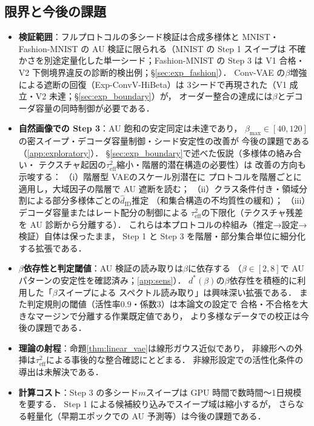\documentclass[11pt,a4paper]{jsarticle}
\newcommand{\hatdID}{\hat{d}_{\mathrm{ID}}}
\newcommand{\dstar}{d^{*}(\beta)}
\begin{document}
\subsection{限界と今後の課題}\label{sec:disc_limitation}

\begin{itemize}
  \item \textbf{検証範囲}：フルプロトコルの多シード検証は合成多様体と
        MNIST・Fashion-MNIST の AU 検証に限られる（MNIST の Step 1 スイープは
        不確かさを別途定量化した単一シード；Fashion-MNIST の Step 3 は
        V1 合格・V2 下側境界違反の診断的検出例；§\ref{sec:exp_fashion}）．
        Conv-VAE の$\beta$増強による遮断の回復（Exp-ConvV-HiBeta）は
        3シードで再現された（V1 成立・V2 未達；§\ref{sec:exp_boundary}）が，
        オーダー整合の達成には$\beta$とデコーダ容量の同時制御が必要である．
  \item \textbf{自然画像での Step 3}：AU 飽和の安定同定は未達であり，
        $\beta_{\max} \in [40, 120]$の密スイープ・デコーダ容量制御・シード安定性の改善が
        今後の課題である（\ref{app:exploratory}）．
        §\ref{sec:exp_boundary}で述べた仮説（多様体の絡み合い・
        テクスチャ起因の$\tau^2_{\mathrm{eff}}$縮小・階層的潜在構造の必要性）は
        改善の方向も示唆する：
        （i）階層型 VAE\cite{sonderby2016ladder}のスケール別潜在に
        プロトコルを階層ごとに適用し，大域因子の階層で AU 遮断を読む；
        （ii）クラス条件付き・領域分割による部分多様体ごとの$\hatdID$推定
        （和集合構造の不均質性の緩和）；
        （iii）デコーダ容量またはレート配分の制御による
        $\tau^2_{\mathrm{eff}}$の下限化（テクスチャ残差を AU 診断から分離する）．
        これらは本プロトコルの枠組み（推定→設定→検証）自体は保ったまま，
        Step 1 と Step 3 を階層・部分集合単位に細分化する拡張である．
  \item \textbf{$\beta$依存性と判定閾値}：AU 検証の読み取りは$\beta$に依存する
        （$\beta \in [2, 8]$で AU パターンの安定性を確認済み；\ref{app:sens}）．
        $\dstar$の$\beta$依存性を積極的に利用した「$\beta$スイープによる
        スペクトル読み取り」は興味深い拡張である．
        また判定規則の閾値（活性率$0.9$・係数$3$）は本論文の設定で
        合格・不合格を大きなマージンで分離する作業既定値であり，
        より多様なデータでの校正は今後の課題である．
  \item \textbf{理論の射程}：命題\ref{thm:linear_vae}は線形ガウス近似であり，
        非線形への外挿は$\tau^2_{\mathrm{eff}}$による事後的な整合確認にとどまる．
        非線形設定での活性化条件の導出は未解決である．
  \item \textbf{計算コスト}：Step 3 の多シード$m$スイープは GPU 時間で数時間〜1日規模を要する．
        Step 1 による候補絞り込みでスイープ域は縮小するが，
        さらなる軽量化（早期エポックでの AU 予測等）は今後の課題である．
\end{itemize}
\end{document}
